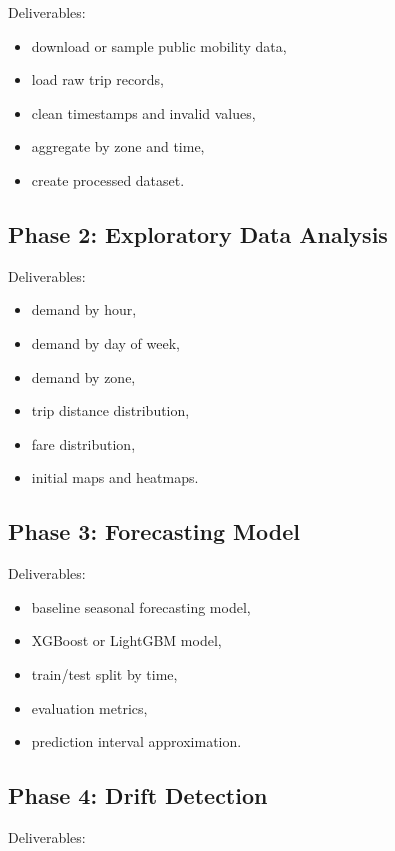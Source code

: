 \documentclass[11pt]{article}
\begin{document}
Deliverables:

\begin{itemize}
    \item download or sample public mobility data,
    \item load raw trip records,
    \item clean timestamps and invalid values,
    \item aggregate by zone and time,
    \item create processed dataset.
\end{itemize}

\subsection{Phase 2: Exploratory Data Analysis}

Deliverables:

\begin{itemize}
    \item demand by hour,
    \item demand by day of week,
    \item demand by zone,
    \item trip distance distribution,
    \item fare distribution,
    \item initial maps and heatmaps.
\end{itemize}

\subsection{Phase 3: Forecasting Model}

Deliverables:

\begin{itemize}
    \item baseline seasonal forecasting model,
    \item XGBoost or LightGBM model,
    \item train/test split by time,
    \item evaluation metrics,
    \item prediction interval approximation.
\end{itemize}

\subsection{Phase 4: Drift Detection}

Deliverables:
\end{document}
